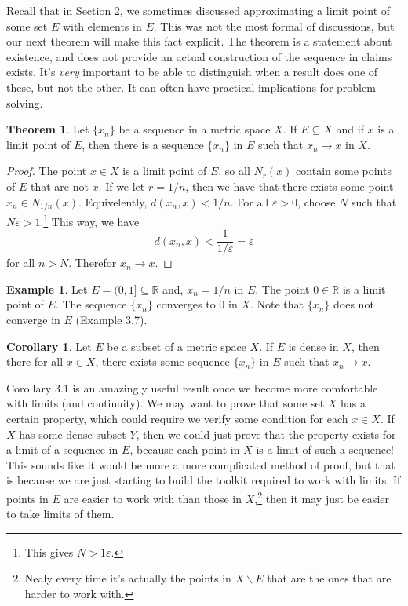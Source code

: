 \documentclass{article}
\newcommand{\R}{\mathbb{R}}
\theoremstyle{definition}
\newtheorem{theorem}{Theorem}[section]
\newtheorem{corollary}{Corollary}[section]
\newtheorem{example}{Example}[section]
\begin{document}
Recall that in Section 2, we sometimes discussed approximating a limit point of some set $ E $ with elements in $ E $. This was not the most formal of discussions, but our next theorem will make this fact explicit. The theorem is a statement about existence, and does not provide an actual construction of the sequence in claims exists. It's \textit{very} important to be able to distinguish when a result does one of these, but not the other. It can often have practical implications for problem solving. 
\begin{theorem}
	Let $ \{x_n\} $ be a sequence in a metric space $ X $. If $ E\subseteq X $ and if $ x $ is a limit point of $ E $, then there is a sequence $ \{x_n\} $ in $ E $ such that $ x_n\to x $ in $ X $. 
\end{theorem}
\begin{proof}
	The point $ x\in X $ is a limit point of $ E $, so all $ N_r(x) $ contain some points of $ E $ that are not $ x $. If we let $ r=1/n $, then we have that there exists some point $ x_n\in N_{1/n}(x) $. Equivelently, $ d(x_n,x)<1/n $. For all $ \varepsilon>0 $, choose $ N $ such that $ N\varepsilon >1 $.\footnote{This gives $ N>1\varepsilon $.} This way, we have $$ d(x_n,x)<\frac{1}{1/\varepsilon}=\varepsilon $$ for all $ n>N $. Therefor $x_n\to x$.
\end{proof}
\begin{example}
	Let $ E=(0,1]\subseteq\R $ and, $ x_n=1/n $ in $ E $. The point $ 0\in\R $ is a limit point of $ E $. The sequence $ \{x_n\} $ converges to $ 0 $ in $ X $. Note that $ \{x_n\} $ does not converge in $ E $ (Example 3.7).   
\end{example}
\begin{corollary}
	Let $ E $ be a subset of a metric space $ X $. If $ E $ is dense in $ X $, then there for all $ x\in X $, there exists some sequence $ \{x_n\} $ in $ E $ such that $ x_n\to x $. 
\end{corollary}
Corollary 3.1 is an amazingly useful result once we become more comfortable with limits (and continuity). We may want to prove that some set $ X $ has a certain property, which could require we verify some condition for each $ x\in X $. If $ X $ has some dense subset $ Y $, then we could just prove that the property exists for a limit of a sequence in $ E $, because each point in $ X $ is a limit of such a sequence! This sounds like it would be more a more complicated method of proof, but that is because we are just starting to build the toolkit required to work with limits. If points in $ E $ are easier to work with than those in $ X $,\footnote{Nealy every time it's actually the points in $ X\backslash E $ that are the ones that are harder to work with.} then it may just be easier to take limits of them. 
\end{document}

